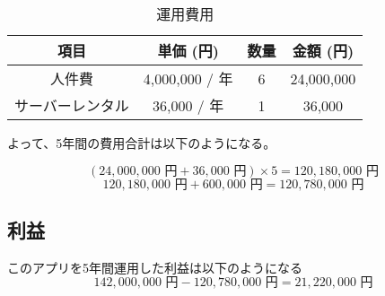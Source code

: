 \begin{table}[H]
\centering
\caption{運用費用}
\begin{tabular}{|c|c|c|c|}
\hline
項目 & 単価 (円) & 数量 & 金額 (円) \\
\hline
人件費 & 4,000,000 / 年 & 6 & 24,000,000 \\
\hline
サーバーレンタル & 36,000 / 年 & 1 & 36,000 \\
\hline
\end{tabular}
\end{table}

よって、5年間の費用合計は以下のようになる。

\[
(24,000,000\text{ 円} + 36,000\text{ 円}) \times 5 = 120,180,000\text{ 円}
\]
\[
120,180,000\text{ 円} + 600,000\text{ 円} = \boxed{120,780,000\text{ 円}}
\]

\subsection{利益}
このアプリを5年間運用した利益は以下のようになる
\[
142,000,000\text{ 円}-120,780,000\text{ 円} = 21,220,000\text{ 円}
\]